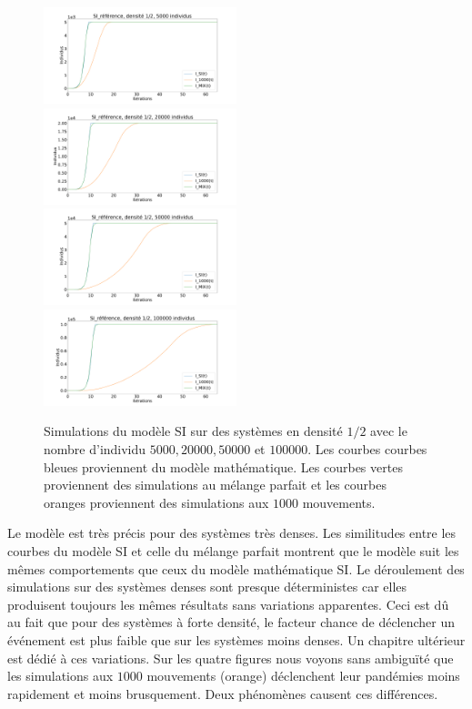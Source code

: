 \begin{figure}
    \centering
    \captionsetup{justification=centering}
    \includegraphics[width=0.5\textwidth]{Images/SI_ref_2_5k.pdf}
    \includegraphics[width=0.5\textwidth]{Images/SI_ref_2_20k.pdf}
    \includegraphics[width=0.5\textwidth]{Images/SI_ref_2_50k.pdf}
    \includegraphics[width=0.5\textwidth]{Images/SI_ref_2_100k.pdf}
    \caption[Simulations de SI, densité 1/2]{Simulations du modèle SI sur des systèmes en densité $1/2$ avec le nombre d'individu $5000,20000,50000$ et $100000$. Les courbes courbes bleues proviennent du modèle mathématique. Les courbes vertes proviennent des simulations au mélange parfait et les courbes oranges proviennent des simulations aux $1000$ mouvements.}
\end{figure}

Le modèle est très précis pour des systèmes très denses. Les similitudes entre les courbes du modèle SI et celle du mélange parfait montrent que le modèle suit les mêmes comportements que ceux du modèle mathématique SI. Le déroulement des simulations sur des systèmes denses sont presque déterministes car elles produisent toujours les mêmes résultats sans variations apparentes. Ceci est dû au fait que pour des systèmes à forte densité, le facteur chance de déclencher un événement est plus faible que sur les systèmes moins denses. Un chapitre ultérieur est dédié à ces variations. Sur les quatre figures nous voyons sans ambiguïté que les simulations aux $1000$ mouvements (orange) déclenchent leur pandémies moins rapidement et moins brusquement. Deux phénomènes causent ces différences. \\


